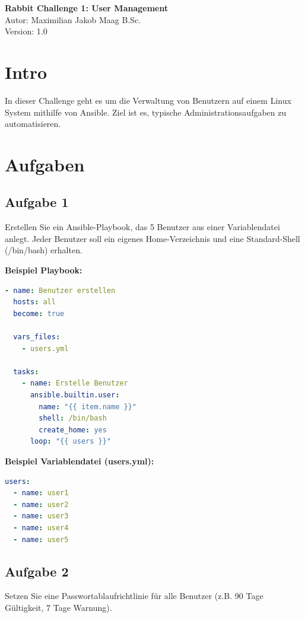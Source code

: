 \documentclass{article}
\begin{document}
    \begin{center}
        \Large \textbf{Rabbit Challenge 1: User Management} \\ [6pt]
        \normalsize
        Autor: Maximilian Jakob Maag B.Sc. \\
        Version: 1.0
    \end{center}

    \section{Intro}
    In dieser Challenge geht es um die Verwaltung von Benutzern auf einem Linux System mithilfe von Ansible. Ziel ist es, typische Administrationsaufgaben zu automatisieren.

    \section{Aufgaben}
    
    \subsection{Aufgabe 1}
    Erstellen Sie ein Ansible-Playbook, das 5 Benutzer aus einer Variablendatei anlegt. Jeder Benutzer soll ein eigenes Home-Verzeichnis und eine Standard-Shell (/bin/bash) erhalten.
    
    \textbf{Beispiel Playbook:}
    
    \begin{lstlisting}[language=yaml]
- name: Benutzer erstellen
  hosts: all
  become: true

  vars_files:
    - users.yml

  tasks:
    - name: Erstelle Benutzer
      ansible.builtin.user:
        name: "{{ item.name }}"
        shell: /bin/bash
        create_home: yes
      loop: "{{ users }}"
    \end{lstlisting}

    \textbf{Beispiel Variablendatei (users.yml):}
    
    \begin{lstlisting}[language=yaml]
users:
  - name: user1
  - name: user2
  - name: user3
  - name: user4
  - name: user5
    \end{lstlisting}

    \subsection{Aufgabe 2}
    Setzen Sie eine Passwortablaufrichtlinie für alle Benutzer (z.B. 90 Tage Gültigkeit, 7 Tage Warnung).
\end{document}
